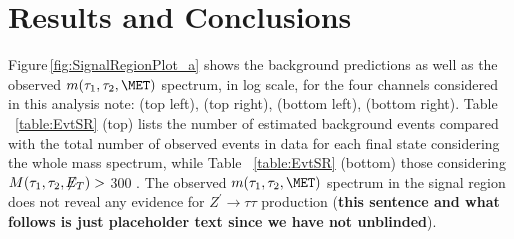 \section{Results and Conclusions}\label{sec:results}

Figure\,\ref{fig:SignalRegionPlot_a} shows the background predictions as well as the observed $m(\tau_{1},\tau_{2},\MET)$ spectrum, in log scale, for the four 
channels considered in this analysis note: \mutau (top left), \ditauhad (top right), \etau (bottom left), \emu (bottom right). 
Table ~\ref{table:EvtSR} (top) lists the number of estimated background events compared with the total number of observed events in data for each final state
considering the whole mass spectrum, while Table ~\ref{table:EvtSR} (bottom) those considering $M(\tau_1,\tau_2,\not\!\!E_T) >$ 300 \GeV.
The observed $m(\tau_{1},\tau_{2},\MET)$ spectrum in the signal region does not reveal any evidence for $Z^{\prime}\to\tau\tau$ production 
(\textbf{this sentence and what follows is just placeholder text since we have not unblinded}). 
